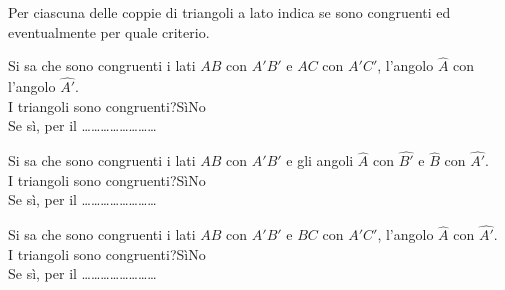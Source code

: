 \begin{esercizio}
\label{ese:2.4}
Per ciascuna delle coppie di triangoli a lato indica se sono congruenti ed eventualmente per quale criterio.\\
\begin{minipage}{.5\linewidth}
\begin{enumeratea}
\item Si sa che sono congruenti i lati $AB$ con $A'B'$ e $AC$ con $A'C'$, l'angolo $\widehat{A}$ con l'angolo $\widehat{A'}$.\\
I triangoli sono congruenti?\tab	Sì\quad	No\\
Se sì, per il \ldots\ldots\ldots\ldots\ldots\ldots\ldots\ldots

\item Si sa che sono congruenti i lati $AB$ con $A'B'$ e gli angoli $\widehat{A}$ con $\widehat{B'}$ e $\widehat{B}$ con $\widehat{A'}$.\\
I triangoli sono congruenti?\tab	Sì\quad	No\\
Se sì, per il \ldots\ldots\ldots\ldots\ldots\ldots\ldots\ldots

\item Si sa che sono congruenti i lati $AB$ con $A'B'$ e $BC$ con $A'C'$, l'angolo $\widehat{A}$ con $\widehat{A'}$.\\
I triangoli sono congruenti?\tab	Sì\quad	No\\
Se sì, per il \ldots\ldots\ldots\ldots\ldots\ldots\ldots\ldots
\end{enumeratea}
\end{minipage}\hfil
\begin{minipage}{.4\linewidth}
  \centering
    
\end{minipage}
\end{esercizio}

